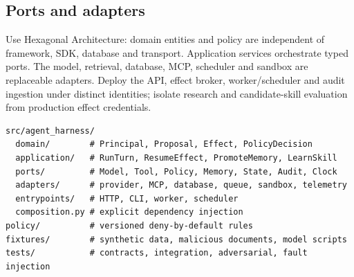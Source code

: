 \documentclass[11pt,letterpaper]{article}
\begin{document}
\subsection{Ports and adapters}
Use Hexagonal Architecture: domain entities and policy are independent of framework, SDK, database and transport. Application services orchestrate typed ports. The model, retrieval, database, MCP, scheduler and sandbox are replaceable adapters. Deploy the API, effect broker, worker/scheduler and audit ingestion under distinct identities; isolate research and candidate-skill evaluation from production effect credentials.
\begin{center}\end{center}
\begin{lstlisting}
src/agent_harness/
  domain/        # Principal, Proposal, Effect, PolicyDecision
  application/   # RunTurn, ResumeEffect, PromoteMemory, LearnSkill
  ports/         # Model, Tool, Policy, Memory, State, Audit, Clock
  adapters/      # provider, MCP, database, queue, sandbox, telemetry
  entrypoints/   # HTTP, CLI, worker, scheduler
  composition.py # explicit dependency injection
policy/          # versioned deny-by-default rules
fixtures/        # synthetic data, malicious documents, model scripts
tests/           # contracts, integration, adversarial, fault injection
\end{lstlisting}
\end{document}
